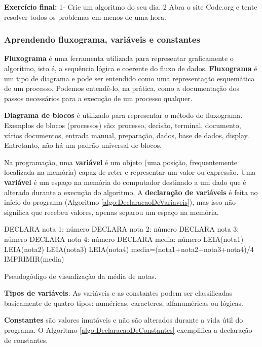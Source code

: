 \documentclass[12pt,a4paper]{article}
\begin{document}
	\textbf{Exercício final:} 1- Crie um algoritmo do seu dia. 2 Abra o site Code.org e tente resolver todos os problemas em menos de uma hora.
	
	\subsubsection{Aprendendo fluxograma, variáveis e constantes}
	
	\textbf{Fluxograma} é uma ferramenta utilizada para representar graficamente o algoritmo, isto é, a sequência lógica e coerente do fluxo de dados. \textbf{Fluxograma} é um tipo de diagrama e pode ser entendido como uma representação esquemática de um processo. Podemos entendê-lo, na prática, como a documentação dos passos necessários para a execução de um processo qualquer.
	
	\textbf{Diagrama de blocos} é utilizado para representar o método do fluxograma. Exemplos de blocos (processos) são: processo, decisão, terminal, documento, vários documentos, entrada manual, preparação, dados, base de dados, display.  Entretanto, não há um padrão universal de blocos.
	
	Na programação, uma \textbf{variável} é um objeto (uma posição, frequentemente localizada na memória) capaz de reter e representar um valor ou expressão. Uma \textbf{variável} é um espaço na memória do computador destinado a um dado que é alterado durante a execução do algoritmo. A \textbf{declaração de variáveis} é feita no início do programa (Algoritmo \ref{algo:DeclaracaoDeVariaveis}), mas isso não significa que recebeu valores, apenas separou um espaço na memória.
	
	\begin{algorithm}[!htpb]
		\DontPrintSemicolon
		DECLARA nota 1: número\;
		DECLARA nota 2: número\;
		DECLARA nota 3: número\;
		DECLARA nota 4: número\;
		DECLARA media: número\;
		LEIA(nota1)\;
		LEIA(nota2)\;
		LEIA(nota3)\;
		LEIA(nota4)\;
		media=(nota1+nota2+nota3+nota4)/4\;
		IMPRIMIR(media)\;
		\caption{Pseudogódigo de visualização da média de notas.}
		\label{algo:DeclaracaoDeVariaveis}
	\end{algorithm}
	
	\textbf{Tipos de variáveis}: As variáveis e as constantes podem ser classificadas basicamente de quatro tipos: numéricas, caracteres, alfanuméricas ou lógicas.
	
	\textbf{Constantes} são valores imutáveis e não são alterados durante a vida útil do programa. O Algoritmo \ref{algo:DeclaracaoDeConstantes} exemplifica a declaração de constantes.
	
\end{document}
